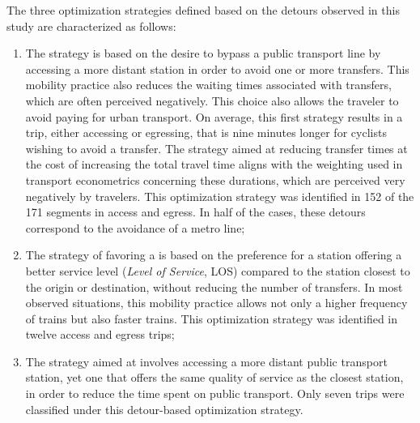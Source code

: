 \begin{refsegment}
The three optimization strategies defined based on the detours observed in this study are characterized as follows:
\begin{enumerate}
    \item The  strategy is based on the desire to bypass a public transport line by accessing a more distant station in order to avoid one or more transfers. This mobility practice also reduces the waiting times associated with transfers, which are often perceived negatively. This choice also allows the traveler to avoid paying for urban transport. On average, this first strategy results in a trip, either accessing or egressing, that is nine minutes longer for cyclists wishing to avoid a transfer. The strategy aimed at reducing transfer times at the cost of increasing the total travel time aligns with the weighting used in transport econometrics concerning these durations, which are perceived very negatively by travelers. This optimization strategy was identified in 152 of the 171 segments in access and egress. In half of the cases, these detours correspond to the avoidance of a metro line;
    \item The strategy of favoring a  is based on the preference for a station offering a better service level (\textsl{Level of Service}, LOS) compared to the station closest to the origin or destination, without reducing the number of transfers. In most observed situations, this mobility practice allows not only a higher frequency of trains but also faster trains. This optimization strategy was identified in twelve access and egress trips;
    \item The strategy aimed at  involves accessing a more distant public transport station, yet one that offers the same quality of service as the closest station, in order to reduce the time spent on public transport. Only seven trips were classified under this detour-based optimization strategy.
\end{enumerate}%


\end{refsegment}
